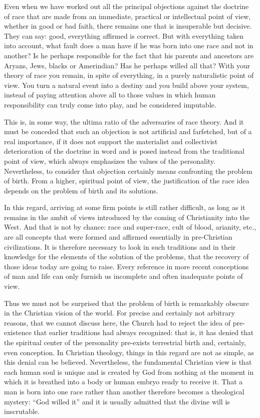 Even when we have worked out all the principal objections against the doctrine of race that are made from an immediate, practical or intellectual point of view, whether in good or bad faith, there remains one that is insuperable but decisive. They can say: good, everything affirmed is correct. But with everything taken into account, what fault does a man have if he was born into one race and not in another? Is he perhaps responsible for the fact that his parents and ancestors are Aryans, Jews, blacks or Amerindian? Has he perhaps willed all that? With your theory of race you remain, in spite of everything, in a purely naturalistic point of view. You turn a natural event into a destiny and you build above your system, instead of paying attention above all to those values in which human responsibility can truly come into play, and be considered imputable.

This is, in some way, the ultima ratio of the adversaries of race theory. And it must be conceded that such an objection is not artificial and farfetched, but of a real importance, if it does not support the materialist and collectivist deterioration of the doctrine in word and is posed instead from the traditional point of view, which always emphasizes the values of the personality. Nevertheless, to consider that objection certainly means confronting the problem of birth. From a higher, spiritual point of view, the justification of the race idea depends on the problem of birth and its solutions.

In this regard, arriving at some firm points is still rather difficult, as long as it remains in the ambit of views introduced by the coming of Christianity into the West. And that is not by chance: race and super-race, cult of blood, arianity, etc., are all concepts that were formed and affirmed essentially in pre-Christian civilizations. It is therefore necessary to look in such traditions and in their knowledge for the elements of the solution of the problems, that the recovery of those ideas today are going to raise. Every reference in more recent conceptions of man and life can only furnish us incomplete and often inadequate points of view.

Thus we must not be surprised that the problem of birth is remarkably obscure in the Christian vision of the world. For precise and certainly not arbitrary reasons, that we cannot discuss here, the Church had to reject the idea of pre-existence that earlier traditions had always recognized: that is, it has denied that the spiritual center of the personality pre-exists terrestrial birth and, certainly, even conception. In Christian theology, things in this regard are not as simple, as this denial can be believed. Nevertheless, the fundamental Christian view is that each human soul is unique and is created by God from nothing at the moment in which it is breathed into a body or human embryo ready to receive it. That a man is born into one race rather than another therefore becomes a theological mystery: ``God willed it'' and it is usually admitted that the divine will is inscrutable.

